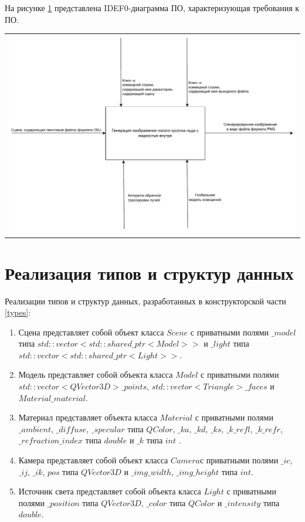 На рисунке \ref{img:idef} представлена IDEF0-диаграмма ПО, характеризующая требования к ПО.
\begin{table}[H]
	\centering
	\begin{tabular}{p{1\linewidth}}
		\centering
		\includegraphics[width=1.0\linewidth]{include/idef0.pdf}
		\captionof{figure}{IDEF0-диаграмма ПО}
		\label{img:idef}
	\end{tabular}
\end{table}

\section{Реализация типов и структур данных}
Реализации типов и структур данных, разработанных в конструкторской части \ref{types}:
\begin{enumerate}[label=\arabic*)]
	\item  Сцена представляет собой объект класса $Scene$ с приватными полями $\_model$ типа $std::vector<std::shared\_ptr<Model>>$ и $\_light$ типа $std::vector<std::shared\_ptr<Light>>$.
	\item  Модель представляет собой объекта класса $Model$ с приватными полями
	$std::vector<QVector3D> \_points$, $std::vector<Triangle> \_faces$ и $Material \_material$.
	\item Материал представляет объекта класса $Material$ с приватными полями $\_ambient$, $\_diffuse$, $\_specular$ типа $QColor$, $\_ka$, $\_kd$, $\_ks$, $\_k\_refl$, $\_k\_refr$, $\_refraction\_index$ типа $double$ и $\_k$ типа $int$ .
	\item Камера представляет собой объект класса $Camera $с приватными полями $\_ic$, $\_ij$, $\_ik$, $pos$ типа $QVector3D$ и $\_img\_width$, $\_img\_height$ типа $int$.
	\item Источник света представляет собой объекта класса $Light$ с приватными полями $\_position$ типа $QVector3D$, $\_color$ типа $QColor$ и $\_intensity$ типа $double$. 
\end{enumerate}

